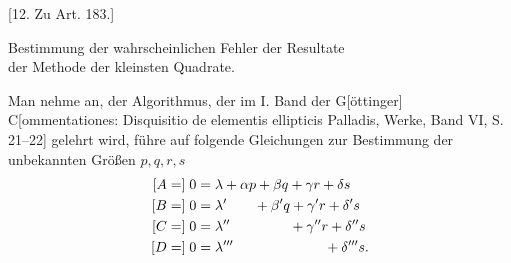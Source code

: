 \begin{center}
[12. Zu Art. 183.]
\end{center}
\begin{center}
Bestimmung der wahrscheinlichen Fehler der Resultate\\
der Methode der kleinsten Quadrate.
\end{center}
Man nehme an, der Algorithmus, der im I. Band der G[öttinger] C[ommenta\-tiones: Disquisitio de elementis ellipticis Palladis, Werke, Band VI, S. 21--22] gelehrt wird, führe auf folgende Gleichungen zur Bestimmung der unbekannten Größen \(p,q,r,s\)
\[
\begin{aligned}
\relax[A=]\;0&=\lambda+\alpha p+\beta q+\gamma r+\delta s\\
[B=]\;0&=\lambda'\phantom{+\alpha p}+\beta'q+\gamma'r+\delta's\\
[C=]\;0&=\lambda''\phantom{+\alpha p+\beta q}+\gamma''r+\delta''s\\
[D=]\;0&=\lambda'''\phantom{+\alpha p+\beta q+\gamma r}+\delta'''s.
\end{aligned}
\]

